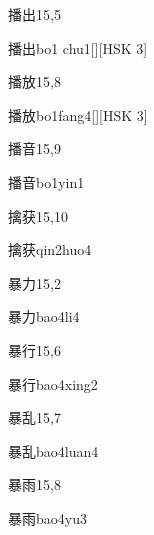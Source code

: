 \begin{entry}{播出}{15,5}
  \begin{phonetics}{播出}{bo1 chu1}[][HSK 3]
  \end{phonetics}
\end{entry}

\begin{entry}{播放}{15,8}
  \begin{phonetics}{播放}{bo1fang4}[][HSK 3]
  \end{phonetics}
\end{entry}

\begin{entry}{播音}{15,9}
  \begin{phonetics}{播音}{bo1yin1}
  \end{phonetics}
\end{entry}

\begin{entry}{擒获}{15,10}
  \begin{phonetics}{擒获}{qin2huo4}
  \end{phonetics}
\end{entry}

\begin{entry}{暴力}{15,2}
  \begin{phonetics}{暴力}{bao4li4}
  \end{phonetics}
\end{entry}

\begin{entry}{暴行}{15,6}
  \begin{phonetics}{暴行}{bao4xing2}
  \end{phonetics}
\end{entry}

\begin{entry}{暴乱}{15,7}
  \begin{phonetics}{暴乱}{bao4luan4}
  \end{phonetics}
\end{entry}

\begin{entry}{暴雨}{15,8}
  \begin{phonetics}{暴雨}{bao4yu3}
  \end{phonetics}
\end{entry}


